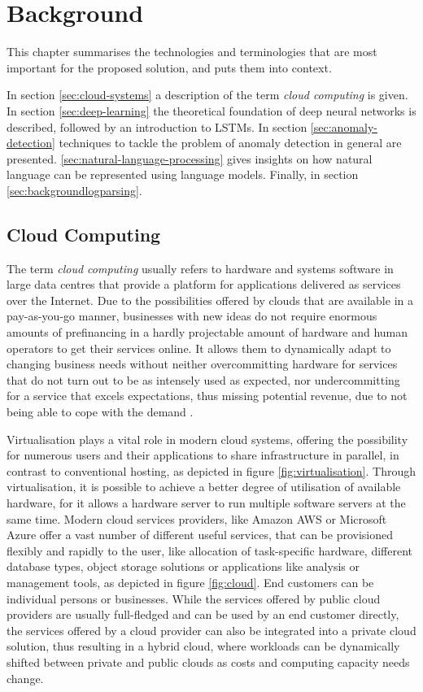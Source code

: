 \chapter{Background\label{cha:background}}
This chapter summarises the technologies and terminologies that are most important for the proposed solution, and puts them into context.

In section \ref{sec:cloud-systems} a description of the term \textit{cloud computing} is given. In section \ref{sec:deep-learning} the theoretical foundation of deep neural networks is described, followed by an introduction to LSTMs. In section \ref{sec:anomaly-detection} techniques to tackle the problem of anomaly detection in general are presented. \ref{sec:natural-language-processing} gives insights on how natural language can be represented using language models. Finally, in section \ref{sec:backgroundlogparsing}.

\section{Cloud Computing\label{sec:cloud-systems}}
The term \textit{cloud computing} usually refers to hardware and systems software in large data centres that provide a platform for applications delivered as services over the Internet. Due to the possibilities offered by clouds that are available in a pay-as-you-go manner, businesses with new ideas do not require enormous amounts of prefinancing in a hardly projectable amount of hardware and human operators to get their services online. It allows them to dynamically adapt to changing business needs without neither overcommitting hardware for services that do not turn out to be as intensely used as expected, nor undercommitting for a service that excels expectations, thus missing potential revenue, due to not being able to cope with the demand \cite{armbrust2010view}.

Virtualisation plays a vital role in modern cloud systems, offering the possibility for numerous users and their applications to share infrastructure in parallel, in contrast to conventional hosting, as depicted in figure \ref{fig:virtualisation}. Through virtualisation, it is possible to achieve a better degree of utilisation of available hardware, for it allows a hardware server to run multiple software servers at the same time. Modern cloud services providers, like Amazon AWS or Microsoft Azure offer a vast number of different useful services, that can be provisioned flexibly and rapidly to the user, like allocation of task-specific hardware, different database types, object storage solutions or applications like analysis or management tools, as depicted in figure \ref{fig:cloud}. End customers can be individual persons or businesses. While the services offered by public cloud providers are usually full-fledged and can be used by an end customer directly, the services offered by a cloud provider can also be integrated into a private cloud solution, thus resulting in a hybrid cloud, where workloads can be dynamically shifted between private and public clouds as costs and computing capacity needs change.


